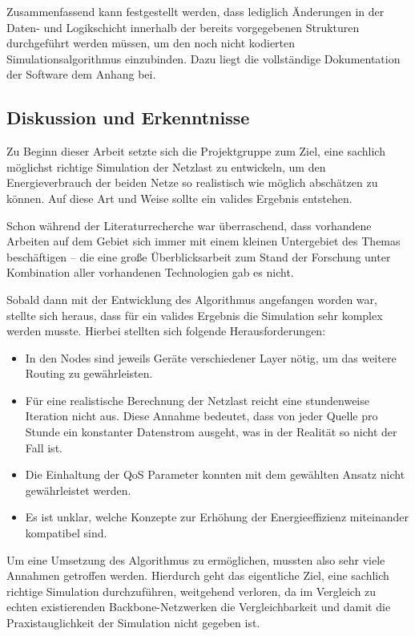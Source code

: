 Zusammenfassend kann festgestellt werden, dass lediglich Änderungen in der Daten- und Logikschicht innerhalb der bereits vorgegebenen Strukturen durchgeführt werden müssen, um den noch nicht kodierten Simulationsalgorithmus einzubinden. Dazu liegt die vollständige Dokumentation der Software dem Anhang bei.


\subsection{Diskussion und Erkenntnisse} \label{subsec:ErgDiskussion}

Zu Beginn dieser Arbeit setzte sich die Projektgruppe zum Ziel, eine sachlich möglichst richtige Simulation der Netzlast zu entwickeln, um den Energieverbrauch der beiden Netze so realistisch wie möglich abschätzen zu können. Auf diese Art und Weise sollte ein valides Ergebnis entstehen.

Schon während der Literaturrecherche war überraschend, dass vorhandene Arbeiten auf dem Gebiet sich immer mit einem kleinen Untergebiet des Themas beschäftigen -- die eine große Überblicksarbeit zum Stand der Forschung unter Kombination aller vorhandenen Technologien gab es nicht.

Sobald dann mit der Entwicklung des Algorithmus angefangen worden war, stellte sich heraus, dass für ein valides Ergebnis die Simulation sehr komplex werden musste. Hierbei stellten sich folgende Herausforderungen:
\begin{itemize}
	\item In den Nodes sind jeweils Geräte verschiedener Layer nötig, um das weitere Routing zu gewährleisten. 
	\item Für eine realistische Berechnung der Netzlast reicht eine stundenweise Iteration nicht aus. Diese Annahme bedeutet, dass von jeder Quelle pro Stunde ein konstanter Datenstrom ausgeht, was in der Realität so nicht der Fall ist.
	\item Die Einhaltung der QoS Parameter konnten mit dem gewählten Ansatz nicht ge\-währ\-lei\-stet werden.
	\item Es ist unklar, welche Konzepte zur Erhöhung der Energieeffizienz miteinander kompatibel sind.
\end{itemize}

Um eine Umsetzung des Algorithmus zu ermöglichen, mussten also sehr viele Annahmen getroffen werden. Hierdurch geht das eigentliche Ziel, eine sachlich richtige Simulation durchzuführen, weitgehend verloren, da im Vergleich zu echten existierenden Backbone-Netzwerken die Vergleichbarkeit und damit die Praxistauglichkeit der Simulation nicht gegeben ist.

